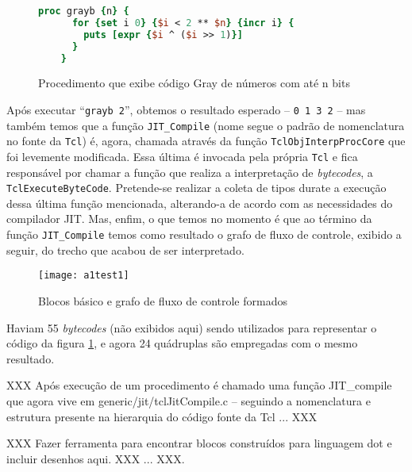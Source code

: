 \begin{figure}[h]
  \centering
  \begin{lstlisting}[language=Tcl]
    proc grayb {n} {
      for {set i 0} {$i < 2 ** $n} {incr i} {
        puts [expr {$i ^ ($i >> 1)}]
      }
    }
  \end{lstlisting}
  \caption{Procedimento que exibe código Gray de números com até n
    bits \label{fig:gray}}
\end{figure}

Após executar ``\verb!grayb 2!'', obtemos
o resultado esperado -- \verb!0 1 3 2! -- mas também temos que a função
\verb!JIT_Compile! (nome segue o padrão de nomenclatura no fonte da
\texttt{Tcl}) é, agora, chamada através da função
\verb!TclObjInterpProcCore! que foi levemente modificada.
Essa última é invocada pela própria
\texttt{Tcl} e fica responsável por chamar a função que realiza a
interpretação de \textit{bytecodes}, a
\verb!TclExecuteByteCode!. Pretende-se realizar a coleta de tipos
durate a execução dessa última função mencionada, alterando-a de
acordo com as necessidades do compilador JIT. Mas, enfim, o que temos
no momento é que ao término da função
\verb!JIT_Compile! temos como resultado o grafo de fluxo de controle,
exibido a seguir, do trecho que acabou de ser interpretado.







\begin{figure}[h]
  \centering
  \texttt{[image: a1test1]}
  \caption{Blocos básico e grafo de fluxo de controle formados}
\end{figure}

Haviam 55 \textit{bytecodes} (não exibidos aqui) sendo utilizados para
representar o código da figura \ref{fig:gray}, e agora 24 quádruplas
são empregadas com o mesmo resultado.


XXX Após execução de um procedimento é chamado uma função JIT\_compile
que agora vive em generic/jit/tclJitCompile.c -- seguindo a nomenclatura
e estrutura presente na hierarquia do código fonte da Tcl ... XXX

XXX Fazer ferramenta para encontrar blocos construídos para linguagem
dot e incluir desenhos aqui. XXX
... XXX.

